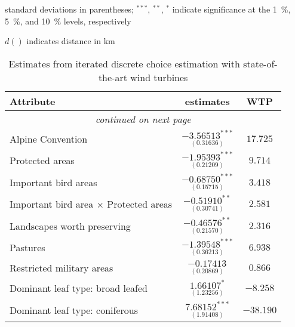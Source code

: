 \begin{ThreePartTable}
 \renewcommand\TPTminimum{\textwidth}
    \begin{TableNotes}
        \footnotesize
        \item standard deviations in parentheses; $^{***}$, $^{**}$, $^{*}$ indicate significance at the \SI{1}{\percent}, \SI{5}{\percent}, and \SI{10}{\percent} levels, respectively
        \item $d()$ indicates distance in km
    \end{TableNotes}
        
    \begin{longtable}{l c c}
        \caption{Estimates from iterated discrete choice estimation with state-of-the-art wind turbines} \label{tab:sensitivity}\\
        \toprule
        \textbf{Attribute} & \textbf{estimates}  & \textbf{WTP}\\
        \midrule
        \endhead
        \midrule
        \multicolumn{3}{c}{\textit{continued on next page}} 
        \endfoot
        \bottomrule
        \insertTableNotes
        \endlastfoot
         Airports                                     & $\underset{(0.36111)}{-2.52935^{***}}$ & $12.575$ \\ 
         Alpine Convention                            & $\underset{(0.31636)}{-3.56513^{***}}$ & $17.725$ \\
         Protected areas                              & $\underset{(0.21209)}{-1.95393^{***}}$ & $9.714$ \\      
         Important bird areas                         & $\underset{(0.15715)}{-0.68750^{***}}$ & $3.418$ \\
         Important bird area $\times$ Protected areas & $\underset{(0.30741)}{-0.51910^{**}}$ & $2.581$ \\
         Landscapes worth preserving                  & $\underset{(0.21570)}{-0.46576^{**}}$   & $2.316$  \\
         Pastures                                     & $\underset{(0.36213)}{-1.39548^{***}}$ & $6.938$ \\ 
         Restricted military areas                    & $\underset{(0.20869)}{-0.17413^{}}$    & $0.866$ \\ 
         Dominant leaf type: broad leafed             & $\underset{(1.23256)}{1.66107^{*}}$   & $-8.258$  \\
         Dominant leaf type: coniferous               & $\underset{(1.91408)}{7.68152^{***}}$  & $-38.190$  \\

\end{longtable}
\end{ThreePartTable}
